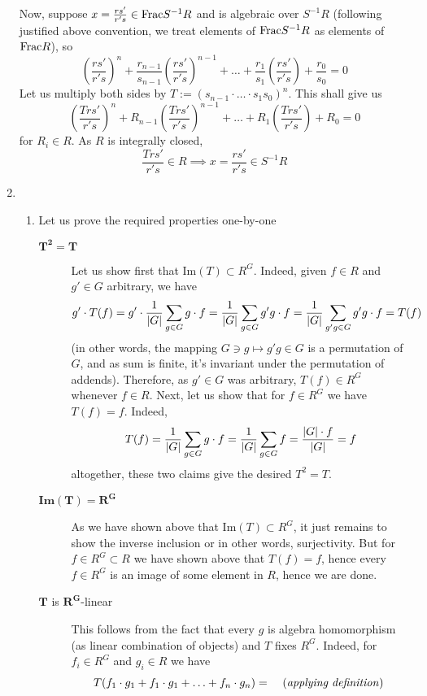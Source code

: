 \documentclass[8pt]{article} %
\begin{document}
\begin{enumerate}[label=\bfseries Problem \arabic*.]
		Now, suppose $x=\frac{rs'}{r's}\in\mbox{Frac} S^{-1}R$ and is algebraic over $S^{-1}R$ (following justified above convention,
		we treat elements of $\mbox{Frac} S^{-1}R$ as elements of $\mbox{Frac} R$), so 
		\[\left(\frac{rs'}{r's}\right)^n+\frac{r_{n-1}}{s_{n-1}}\left(\frac{rs'}{r's}\right)^{n-1}+\hdots+
		\frac{r_1}{s_1}\left(\frac{rs'}{r's}\right)+\frac{r_0}{s_0}=0\]
		Let us multiply both sides by $T:=(s_{n-1}\cdot\hdots\cdot s_1s_0)^n$. This shall give us
		\[\left(\frac{Trs'}{r's}\right)^n+R_{n-1}\left(\frac{Trs'}{r's}\right)^{n-1}+\hdots+
		R_1\left(\frac{Trs'}{r's}\right)+R_0=0\]
		for $R_i\in R$. As $R$ is integrally closed, \[\frac{Trs'}{r's}\in R\implies x=\frac{rs'}{r's}\in S^{-1}R\]
	\item \begin{enumerate}[label=(\arabic*).]
			\item Let us prove the required properties one-by-one
				\begin{description}
					\item[$\mathbf{T^2=T}$] Let us show first that $\mbox{Im}(T)\subset R^G$. Indeed, given $f\in R$ and
						$g'\in G$ arbitrary, we have
						\[g'\cdot T(f)=g'\cdot\frac{1}{\myabs{G}}\sum_{g\in G}g\cdot f=\frac{1}{\myabs{G}}\sum_{g\in G}
						g'g\cdot f=\frac{1}{\myabs{G}}\sum_{g'g\in G} g'g\cdot f=T(f)\]
						(in other words, the mapping $G\ni g\mapsto g'g\in G$ is a permutation of $G$, and as sum is 
						finite, it's invariant under the permutation of addends). Therefore, as $g'\in G$ was arbitrary,
						$T(f)\in R^G$ whenever $f\in R$. Next, let us show that for $f\in R^G$ we have $T(f)=f$. Indeed,
						\[T(f)=\frac{1}{\myabs{G}}\sum_{g\in G} g\cdot f=\frac{1}{\myabs{G}}\sum_{g\in G}f=\frac{\myabs{G}
						\cdot f}{\myabs{G}}=f\]
						altogether, these two claims give the desired $T^2=T$.
					\item[$\mathbf{\mbox{Im}(T)=R^G}$] As we have shown above that $\mbox{Im}(T)\subset R^G$, it just
						remains to show the inverse inclusion or in other words, surjectivity. But for $f\in R^G\subset R$
						we have shown above that $T(f)=f$, hence every $f\in R^G$ is an image of some element in $R$, hence
						we are done.
					\item[$\mathbf{T}$ is $\mathbf{R^G}$-linear] This follows from the fact that every $g$ is algebra 
						homomorphism (as linear combination of objects) and $T$ fixes $R^G$. Indeed, for $f_i\in R^G$ and
						$g_i\in R$ we have
					\[\begin{array}{rr}
					T(f_1\cdot g_1+f_1\cdot g_1+\hdots+f_n\cdot g_n)= &\mbox{ (\textit{applying definition}) }\\\\

\end{array}\]
\end{description}
\end{enumerate}
\end{enumerate}
\end{document}
